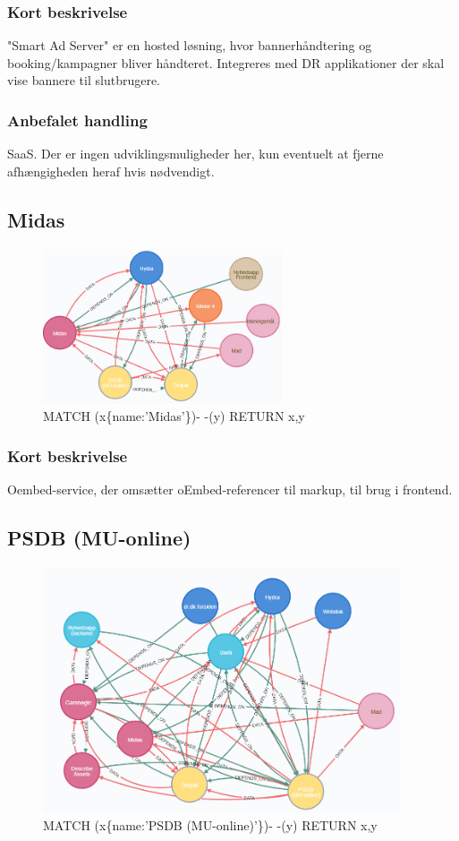 \documentclass{article}
\begin{document}
\subsubsection*{Kort beskrivelse}
"Smart Ad Server" er en hosted løsning, hvor bannerhåndtering og booking/kampagner bliver håndteret. Integreres med DR applikationer der skal vise bannere til slutbrugere.
\subsubsection*{Anbefalet handling}
SaaS. Der er ingen udviklingsmuligheder her, kun eventuelt at fjerne afhængigheden heraf hvis nødvendigt.



\subsection{Midas}
\begin{figure}[h]
\includegraphics[width=200pt]{Midas.PNG}
\caption{MATCH (x\{name:'Midas'\})- -(y) RETURN x,y}
\end{figure}
\subsubsection*{Kort beskrivelse}
Oembed-service, der omsætter oEmbed-referencer til markup, til brug i frontend.



\subsection{PSDB (MU-online)}
\begin{figure}[h]
\includegraphics[width=300pt]{PSDB.PNG}
\caption{MATCH (x\{name:'PSDB (MU-online)'\})- -(y) RETURN x,y}
\end{figure}
\end{document}
